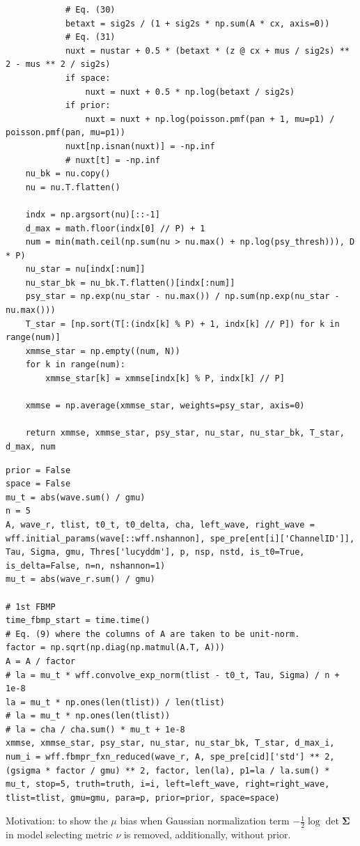 \documentclass[notitlepage]{article}
\begin{document}
\begin{lstlisting}
            # Eq. (30)
            betaxt = sig2s / (1 + sig2s * np.sum(A * cx, axis=0))
            # Eq. (31)
            nuxt = nustar + 0.5 * (betaxt * (z @ cx + mus / sig2s) ** 2 - mus ** 2 / sig2s)
            if space:
                nuxt = nuxt + 0.5 * np.log(betaxt / sig2s)
            if prior:
                nuxt = nuxt + np.log(poisson.pmf(pan + 1, mu=p1) / poisson.pmf(pan, mu=p1))
            nuxt[np.isnan(nuxt)] = -np.inf
            # nuxt[t] = -np.inf
    nu_bk = nu.copy()
    nu = nu.T.flatten()

    indx = np.argsort(nu)[::-1]
    d_max = math.floor(indx[0] // P) + 1
    num = min(math.ceil(np.sum(nu > nu.max() + np.log(psy_thresh))), D * P)
    nu_star = nu[indx[:num]]
    nu_star_bk = nu_bk.T.flatten()[indx[:num]]
    psy_star = np.exp(nu_star - nu.max()) / np.sum(np.exp(nu_star - nu.max()))
    T_star = [np.sort(T[:(indx[k] % P) + 1, indx[k] // P]) for k in range(num)]
    xmmse_star = np.empty((num, N))
    for k in range(num):
        xmmse_star[k] = xmmse[indx[k] % P, indx[k] // P]

    xmmse = np.average(xmmse_star, weights=psy_star, axis=0)

    return xmmse, xmmse_star, psy_star, nu_star, nu_star_bk, T_star, d_max, num
\end{lstlisting}

\begin{lstlisting}
prior = False
space = False
mu_t = abs(wave.sum() / gmu)
n = 5
A, wave_r, tlist, t0_t, t0_delta, cha, left_wave, right_wave = wff.initial_params(wave[::wff.nshannon], spe_pre[ent[i]['ChannelID']], Tau, Sigma, gmu, Thres['lucyddm'], p, nsp, nstd, is_t0=True, is_delta=False, n=n, nshannon=1)
mu_t = abs(wave_r.sum() / gmu)

# 1st FBMP
time_fbmp_start = time.time()
# Eq. (9) where the columns of A are taken to be unit-norm.
factor = np.sqrt(np.diag(np.matmul(A.T, A)))
A = A / factor
# la = mu_t * wff.convolve_exp_norm(tlist - t0_t, Tau, Sigma) / n + 1e-8
la = mu_t * np.ones(len(tlist)) / len(tlist)
# la = mu_t * np.ones(len(tlist))
# la = cha / cha.sum() * mu_t + 1e-8
xmmse, xmmse_star, psy_star, nu_star, nu_star_bk, T_star, d_max_i, num_i = wff.fbmpr_fxn_reduced(wave_r, A, spe_pre[cid]['std'] ** 2, (gsigma * factor / gmu) ** 2, factor, len(la), p1=la / la.sum() * mu_t, stop=5, truth=truth, i=i, left=left_wave, right=right_wave, tlist=tlist, gmu=gmu, para=p, prior=prior, space=space)
\end{lstlisting}

Motivation: to show the $\mu$ bias when Gaussian normalization term $-\frac{1}{2}\log\det\bm{\Sigma}$ in model selecting metric $\nu$ is removed, additionally, without prior. 
\end{document}
